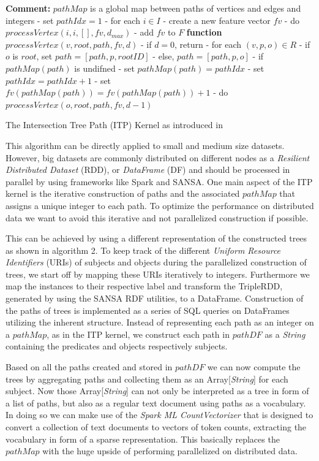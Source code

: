\documentclass{easychair}
\begin{document}
\begin{algorithm}
 \label{alg:ITP}
 \textbf{Comment:} $pathMap$ is a global map between paths of vertices and edges and integers\;
 \;
 - set $pathIdx = 1$\;
 - for each $i \in I$\; \Indp
 - create a new feature vector $fv$\;
 - do $processVertex(i,i,[],fv,d_{max})$\;
 - add $fv$ to $F$\; \Indm
 \;
 \textbf{function} $processVertex(v,root,path,fv,d)$\; \Indp
 - if $d = 0$, return \;
 - for each $(v,p,o) \in R$\; \Indp
 - if $o$ is $root$, set $path = [path,p,rootID]$\;
 - else, $path = [path, p, o]$\;
 - if $pathMap(path)$ is undifned\; \Indp
 - set $pathMap(path) = pathIdx$
 - set$pathIdx = pathIdx + 1$\; \Indm
 - set $fv(pathMap(path)) = fv(pathMap(path)) + 1$\;
 - do $processVertex(o,root,path,fv,d-1)$\;
\caption{The Intersection Tree Path (ITP) Kernel as introduced in \cite{FGK}}
\end{algorithm}
This algorithm can be directly applied to small and medium size datasets. However, big datasets are commonly distributed on different nodes as a \textit{Resilient Distributed Dataset} (RDD), or \textit{DataFrame} (DF) \cite{RDDpaper} and should be processed in parallel by using frameworks like Spark and SANSA. One main aspect of the ITP kernel is the iterative construction of paths and the associated $pathMap$ that assigns a unique integer to each path. To optimize the performance on distributed data we want to avoid this iterative and not parallelized construction if possible.

This can be achieved by using a different representation of the constructed trees as shown in algorithm 2. To keep track of the different \textit{Uniform Resource Identifiers} (URIs) of subjects and objects during the parallelized construction of trees, we start off by mapping these URIs iteratively to integers. Furthermore we map the instances to their respective label and transform the TripleRDD, generated by using the SANSA RDF utilities, to a DataFrame. Construction of the paths of trees is implemented as a series of SQL queries on DataFrames utilizing the inherent structure. Instead of representing each path as an integer on a $pathMap$, as in the ITP kernel, we construct each path in $pathDF$ as a \textit{String} containing the predicates and objects respectively subjects.

Based on all the paths created and stored in $pathDF$ we can now compute the trees by aggregating paths and collecting them as an Array[\textit{String}] for each subject. Now those Array[\textit{String}] can not only be interpreted as a tree in form of a list of paths, but also as a regular text document using paths as a vocabulary.  In doing so we can make use of the \textit{Spark ML CountVectorizer} that is designed to convert a collection of text documents to vectors of token counts, extracting the vocabulary in form of a sparse representation. This basically replaces the $pathMap$ with the huge upside of performing parallelized on distributed data. 
\end{document}
